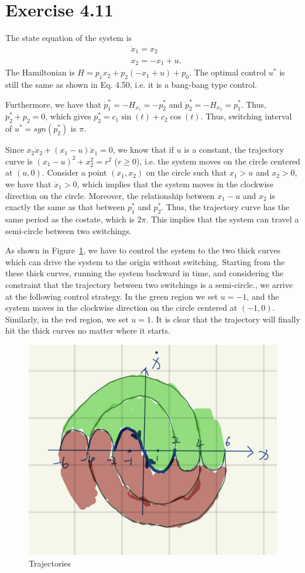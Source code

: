 \documentclass[11pt]{report}
\begin{document}
\section*{Exercise 4.11}
The state equation of the system is
\begin{align*}
& \dot{x}_1 = x_2\\
& \dot{x}_2 = -x_1 + u.
\end{align*}
The Hamiltonian is $H = p_1 x_2 + p_2 (-x_1 + u) + p_0$. The optimal control $u^*$ is still the same as shown in Eq. 4.50, i.e. it is a bang-bang type control.

\noindent Furthermore, we have that $\dot{p}^*_1 = -H_{x_1} = -p^*_2$ and $\dot{p}^*_2 = -H_{x_2} = p^*_1$. Thus, $\ddot{p}_2^* + p_2 = 0$, which gives $p_2^* = c_1 \sin(t) + c_2 \cos(t)$. Thus, switching interval of $u^* = sgn(p_2^*)$ is $\pi$.

\noindent Since $x_2\dot{x}_2 + (x_1-u)\dot{x}_1 = 0$, we know that if $u$ is a constant, the trajectory curve is $(x_1-u)^2 + x_2^2 = r^2$ ($r \geq 0$), i.e. the system moves on the circle centered at $(u, 0)$. Consider a point $(x_1, x_2)$ on the circle such that $x_1 > u$ and $x_2 > 0$, we have that $\dot{x}_1 > 0$, which implies that the system moves in the clockwise direction on the circle. Moreover, the relationship between $x_1-u$ and $x_2$ is exactly the same as that between $p_1^*$ and $p^*_2$. Thus, the trajectory curve has the same period as the costate, which is $2\pi$. This implies that the system can travel a semi-circle between two switchings.

\noindent As shown in Figure~\ref{fig:411}, we have to control the system to the two thick curves which can drive the system to the origin without switching. Starting from the these thick curves, running the system backward in time, and considering the constraint that the trajectory between two switchings is a semi-circle., we arrive at the following control strategy. In the green region we set $u=-1$, and the system moves in the clockwise direction on the circle centered at $(-1,0)$. Similarly, in the red region, we set $u=1$. It is clear that the trajectory will finally hit the thick curves no matter where it starts.
\begin{figure}
    \centering
    \includegraphics[width=.5\textwidth]{ECE553/hw5/hw5_411.jpg}
    \caption{Trajectories}
    \label{fig:411}
\end{figure}
\end{document}

